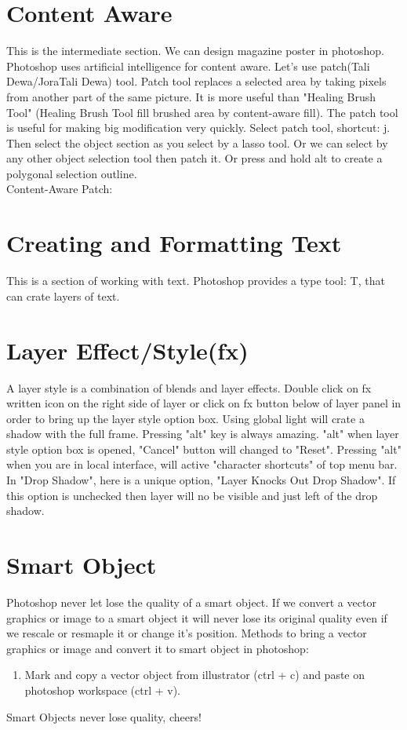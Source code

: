 \documentclass[11 pt]{article}
\newcommand{\I}{\item}
\begin{document}
\section{Content Aware}
This is the intermediate section. We can design magazine poster in photoshop. Photoshop uses artificial intelligence for content aware. Let's use patch(Tali Dewa/JoraTali Dewa) tool. Patch tool replaces a selected area by taking pixels from another part of the same picture. It is more useful than "Healing Brush Tool" (Healing Brush Tool fill brushed area by content-aware fill). The patch tool is useful for making big modification very quickly. Select patch tool, shortcut: j. Then select the object section as you select by a lasso tool. Or we can select by any other object selection tool then patch it. Or press and hold alt to create a polygonal selection outline. \\
Content-Aware Patch:

\section{Creating and Formatting Text}
This is a section of working with text. Photoshop provides a type tool: T, that can crate layers of text.

\section{Layer Effect/Style(fx)}
A layer style is a combination of blends and layer effects. Double click on fx written icon on the right side of layer or click on fx button below of layer panel in order to bring up the layer style option box. Using global light will crate a shadow with the full frame. Pressing "alt" key is always amazing. "alt" when layer style option box is opened, "Cancel" button will changed to "Reset". Pressing "alt" when you are in local interface, will active "character shortcuts" of top menu bar. In "Drop Shadow", here is a unique option, "Layer Knocks Out Drop Shadow". If this option is unchecked then layer will no be visible and just left of the drop shadow.

\section{Smart Object}
Photoshop never let lose the quality of a smart object. If we convert a vector graphics or image to a smart object it will never lose its original quality even if we rescale or resmaple it or change it's position. Methods to bring a vector graphics or image and convert it to smart object in photoshop:
\begin{enumerate}
	\I Mark and copy a vector object from illustrator (ctrl + c) and paste on photoshop workspace (ctrl + v). 
\end{enumerate}
Smart Objects never lose quality, cheers!
\end{document}
